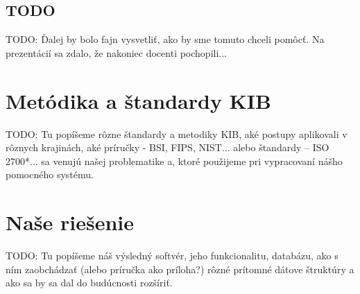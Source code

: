 \section*{TODO} 
TODO: Ďalej by bolo fajn vysvetliť, ako by sme tomuto chceli pomôcť. Na prezentácií sa zdalo, že nakoniec docenti pochopili...

\chapter{Metódika a štandardy KIB}
TODO: Tu popíšeme rôzne štandardy a metodiky KIB, aké postupy aplikovali v rôznych krajinách, aké príručky - BSI, FIPS,
NIST... alebo štandardy -- ISO 2700*... sa venujú našej problematike a, ktoré použijeme pri vypracovaní nášho pomocného
  systému.

\chapter{Naše riešenie}
TODO: Tu popíšeme náš výsledný softvér, jeho funkcionalitu, databázu, ako s ním zaobchádzať (alebo príručka ako príloha?)
rôzné prítomné dátove štruktúry a ako sa by sa dal do budúcnosti rozšíriť.
